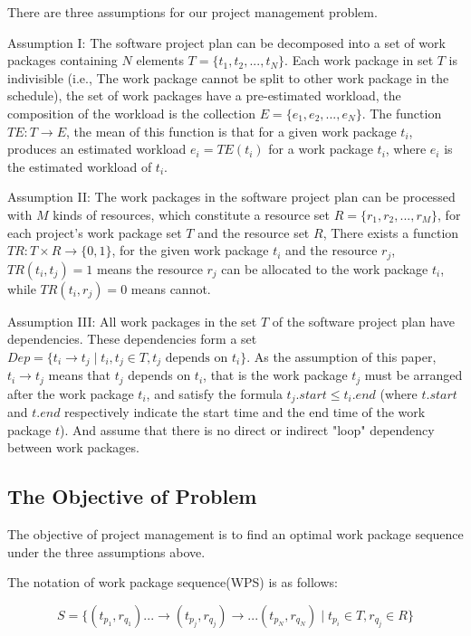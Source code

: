%
There are three assumptions for our project management problem.


Assumption I: The software project plan can be decomposed into a set of
work packages containing $N$ elements $T = \{t_1, t_2, ..., t_N \}$.
Each work package in set $T$ is indivisible (i.e., The work package cannot be
split to other work package in the schedule), the set of work packages have a
pre-estimated workload, the composition of the workload is the collection
$E = \{e _1, e_2, ..., e_N \}$. The function $TE: T \rightarrow E$,
the mean of this function is that for a given work package $t_i$, produces an
estimated workload $e_i = TE(t_i)$ for a work package $t_i$, where $e_i$ is the
estimated workload of $t_i$.


Assumption II: The work packages in the software project plan can be
processed with $M$ kinds of resources, which constitute a resource set
$R = \{r_1, r_2, ..., r_M \}$, for each project's work package set $T$ and the
resource set $R$, There exists a function $TR: T \times R \rightarrow \{0, 1\}$,
for the given work package $t_i$ and the resource $r_j$, $TR(t_i, t_j) = 1$
means the resource $r_j$ can be allocated to the work package $t_i$, while
$TR(t_i, r_j) = 0$ means cannot.


Assumption III: All work packages in the set $T$ of the software project
plan have dependencies. These dependencies form a set
$Dep= \{t_i \rightarrow t_j \mid t_i, t_j \in T, t_j \text{ depends on } t_i\}$.
As the assumption of this paper, $t_i \rightarrow t_j$ means that $t_j$ depends
on $t_i$, that is the work package $t_j$ must be arranged after the work
package $t_i$, and satisfy the formula $t_j.start \leq t_i.end$ (where $t.start$
and $t.end$ respectively indicate the start time and the end time of the work
package $t$).  And assume that there is no direct or indirect "loop" dependency
between work packages.


\subsection{The Objective of Problem}
%
The objective of project management is to find an optimal work package sequence
under the three assumptions above.

The notation of work package sequence(WPS) is as follows:

\begin{equation}
  S = \{
  (t_{p_1}, r_{q_1}) ... \rightarrow (t_{p_j}, r_{q_j}) \rightarrow ... (t_{p_N}, r_{q_N})
  \mid t_{p_i} \in T, r_{q_j} \in R
  \}
  \label{wps}
\end{equation}

